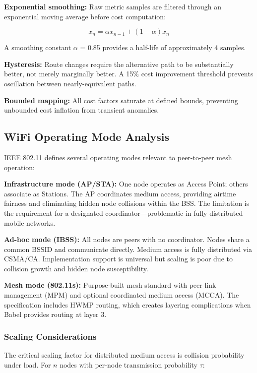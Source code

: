 \textbf{Exponential smoothing:} Raw metric samples are filtered through an exponential moving average before cost computation:

\[
\bar{x}_n = \alpha \bar{x}_{n-1} + (1 - \alpha) x_n
\]

A smoothing constant $\alpha$ = 0.85 provides a half-life of approximately 4 samples.

\textbf{Hysteresis:} Route changes require the alternative path to be substantially better, not merely marginally better. A 15\% cost improvement threshold prevents oscillation between nearly-equivalent paths.

\textbf{Bounded mapping:} All cost factors saturate at defined bounds, preventing unbounded cost inflation from transient anomalies.

\subsection{WiFi Operating Mode Analysis}
\label{sec:wifimode}

IEEE 802.11 defines several operating modes relevant to peer-to-peer mesh operation:

\textbf{Infrastructure mode (AP/STA):} One node operates as Access Point; others associate as Stations. The AP coordinates medium access, providing airtime fairness and eliminating hidden node collisions within the BSS. The limitation is the requirement for a designated coordinator---problematic in fully distributed mobile networks.

\textbf{Ad-hoc mode (IBSS):} All nodes are peers with no coordinator. Nodes share a common BSSID and communicate directly. Medium access is fully distributed via CSMA/CA. Implementation support is universal but scaling is poor due to collision growth and hidden node susceptibility.

\textbf{Mesh mode (802.11s):} Purpose-built mesh standard with peer link management (MPM) and optional coordinated medium access (MCCA). The specification includes HWMP routing, which creates layering complications when Babel provides routing at layer 3.

\subsubsection{Scaling Considerations}

The critical scaling factor for distributed medium access is collision probability under load. For $n$ nodes with per-node transmission probability $\tau$:

